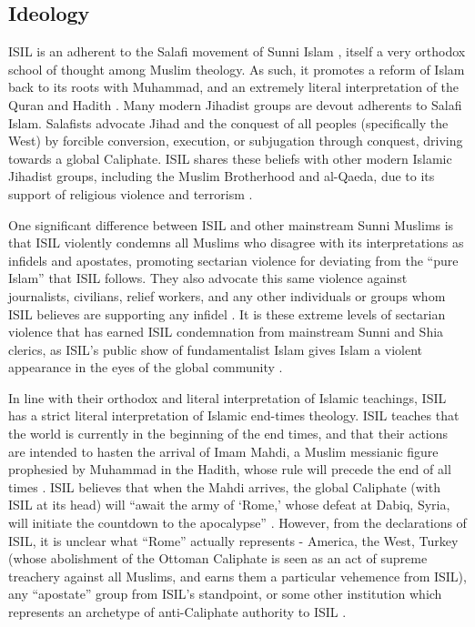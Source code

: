 \documentclass{report}
\begin{document}
    


    \subsection{Ideology}
    
    ISIL is an adherent to the Salafi movement of Sunni Islam \cite{Bradley2015}, itself a very orthodox school of thought among Muslim theology.  As such, it promotes a reform of Islam back to its roots with Muhammad, and an extremely literal interpretation of the Quran and Hadith \cite{Hassan2015}. Many modern Jihadist groups are devout adherents to Salafi Islam. Salafists  advocate Jihad and the conquest of all peoples (specifically the West) by forcible conversion, execution, or subjugation through conquest, driving towards a global Caliphate. ISIL shares these beliefs with other modern Islamic Jihadist groups, including the Muslim Brotherhood and al-Qaeda, due to its support of religious violence and terrorism \cite{schmidt2004great,gabriel2008they,Hassan2015,Moussalli2009}.
    
    One significant difference between ISIL and other mainstream Sunni Muslims is that ISIL violently condemns all Muslims who disagree with its interpretations as infidels and apostates, promoting  sectarian violence for deviating from the \enquote{pure Islam} that ISIL follows. They also advocate this same violence against journalists, civilians, relief workers, and any other individuals or groups whom ISIL believes are supporting any infidel \cite{Wood2015,Hassan2015,AustralianNationalSecurityAttorney-GeneralsDepartment2014}. It is these extreme levels of sectarian violence that has earned ISIL condemnation from mainstream Sunni and Shia clerics, as ISIL's public show of fundamentalist Islam gives Islam a violent appearance in the eyes of the global community \cite{Mandhai2014}.
    
    In line with their  orthodox and literal interpretation of Islamic teachings, ISIL  has a strict literal interpretation of Islamic  end-times theology. ISIL teaches that the world is currently in the beginning of the end times, and that their actions are intended to hasten the arrival of Imam Mahdi, a Muslim messianic figure prophesied by Muhammad in the Hadith, whose rule will precede the end of all times \cite{arabi2008divine,Wood2015}. ISIL believes that when the Mahdi arrives, the global Caliphate (with ISIL at its head)  will \enquote{await the army of \enquote{Rome,} whose defeat at Dabiq, Syria, will initiate the countdown to the apocalypse} \cite{Wood2015}. However, from the declarations of ISIL, it is unclear what \enquote{Rome} actually represents - America, the West, Turkey (whose abolishment of the Ottoman Caliphate is seen as an act of supreme treachery against all Muslims, and earns them a particular vehemence from ISIL), any \enquote{apostate} group from ISIL's standpoint, or some other institution which represents an archetype of anti-Caliphate authority to ISIL \cite{Mortada2014,Wood2015}. 
\end{document}
